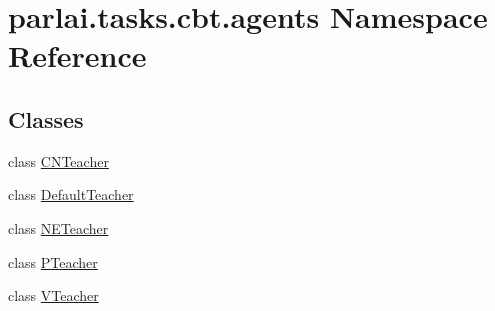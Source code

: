 \hypertarget{namespaceparlai_1_1tasks_1_1cbt_1_1agents}{}\section{parlai.\+tasks.\+cbt.\+agents Namespace Reference}
\label{namespaceparlai_1_1tasks_1_1cbt_1_1agents}
\subsection*{Classes}
\begin{DoxyCompactItemize}
\item 
class \hyperlink{classparlai_1_1tasks_1_1cbt_1_1agents_1_1CNTeacher}{C\+N\+Teacher}
\item 
class \hyperlink{classparlai_1_1tasks_1_1cbt_1_1agents_1_1DefaultTeacher}{Default\+Teacher}
\item 
class \hyperlink{classparlai_1_1tasks_1_1cbt_1_1agents_1_1NETeacher}{N\+E\+Teacher}
\item 
class \hyperlink{classparlai_1_1tasks_1_1cbt_1_1agents_1_1PTeacher}{P\+Teacher}
\item 
class \hyperlink{classparlai_1_1tasks_1_1cbt_1_1agents_1_1VTeacher}{V\+Teacher}
\end{DoxyCompactItemize}
